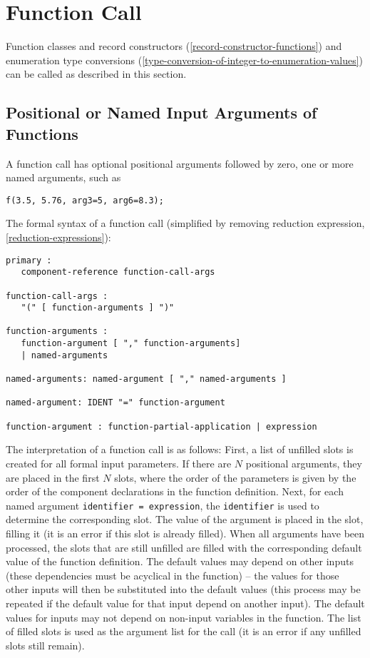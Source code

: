 \section{Function Call}\label{function-call}

Function classes and record constructors (\cref{record-constructor-functions}) and enumeration type
conversions (\cref{type-conversion-of-integer-to-enumeration-values}) can be called as described in this section.

\subsection{Positional or Named Input Arguments of Functions}\label{positional-or-named-input-arguments-of-functions}

A function call has optional positional arguments followed by zero, one
or more named arguments, such as

\begin{lstlisting}[language=modelica]
f(3.5, 5.76, arg3=5, arg6=8.3);
\end{lstlisting}

The formal syntax of a function call (simplified by removing reduction
expression, \cref{reduction-expressions}):
\begin{lstlisting}[language=grammar]
primary :
   component-reference function-call-args

function-call-args :
   "(" [ function-arguments ] ")"

function-arguments :
   function-argument [ "," function-arguments]
   | named-arguments

named-arguments: named-argument [ "," named-arguments ]

named-argument: IDENT "=" function-argument

function-argument : function-partial-application | expression
\end{lstlisting}

The interpretation of a function call is as follows: First, a list of unfilled slots is created for all formal input parameters.  If there are $N$ positional arguments, they are placed in the first
$N$ slots, where the order of the parameters is given by the order of the component declarations in the function definition.  Next, for each named argument \lstinline!identifier = expression!, the
\lstinline!identifier! is used to determine the corresponding slot.  The value of the argument is placed in the slot, filling it (it is an error if this slot is already filled).  When all arguments
have been processed, the slots that are still unfilled are filled with the corresponding default value of the function definition.  The default values may depend on other inputs (these dependencies
must be acyclical in the function) -- the values for those other inputs will then be substituted into the default values (this process may be repeated if the default value for that input depend on another input).  The default values for inputs may not depend on non-input variables in the function.  The list of filled slots is used as the argument list for the call (it is an error if any
unfilled slots still remain).

